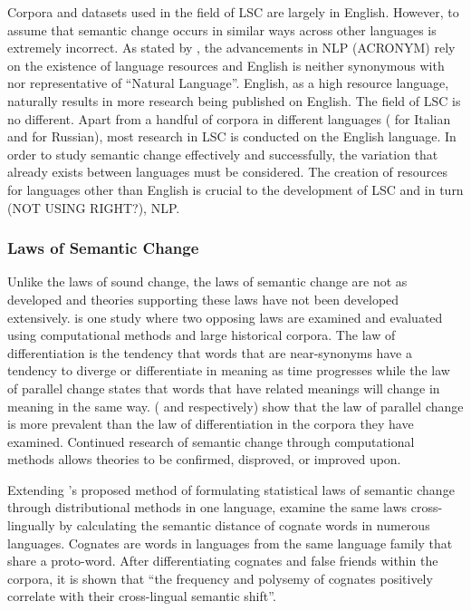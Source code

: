 Corpora and datasets used in the field of LSC are largely in English. However, to assume that semantic change occurs in similar ways across other languages is extremely incorrect. As stated by \citet{bender_2020}, the advancements in NLP (ACRONYM) rely on the existence of language resources and English is neither synonymous with nor representative of “Natural Language”. English, as a high resource language, naturally results in more research being published on English. The field of LSC is no different. Apart from a handful of corpora in different languages (\citet{diacrita_evalita2020} for Italian and \citet{rushifteval2021} for Russian), most research in LSC is conducted on the English language. In order to study semantic change effectively and successfully, the variation that already exists between languages must be considered. The creation of resources for languages other than English is crucial to the development of LSC and in turn (NOT USING RIGHT?), NLP.   

\subsubsection{Laws of Semantic Change}
Unlike the laws of sound change, the laws of semantic change are not as developed and theories supporting these laws have not been developed extensively. \citep{Xu2015ACE} \citet{Xu2015ACE} is one study where two opposing laws are examined and evaluated using computational methods and large historical corpora. The law of differentiation is the tendency that words that are near-synonyms have a tendency to diverge or differentiate in meaning as time progresses while the law of parallel change states that words that have related meanings will change in meaning in the same way. (\citet{breal1897essai} and \citet{stern-1921} respectively)  \citet{Xu2015ACE} show that the law of parallel change is more prevalent than the law of differentiation in the corpora they have examined. Continued research of semantic change through computational methods allows theories to be confirmed, disproved, or improved upon. 

Extending \citet{hamilton-etal-2016-diachronic}’s proposed method of formulating statistical laws of semantic change through distributional methods in one language, \citet{uban-etal-2019-studying} examine the same laws cross-lingually by calculating the semantic distance of cognate words in numerous languages. Cognates are words in languages from the same language family that share a proto-word. After differentiating cognates and false friends within the corpora, it is shown that “the frequency and polysemy of cognates positively correlate with their cross-lingual semantic shift”. \citep{uban-etal-2019-studying}

